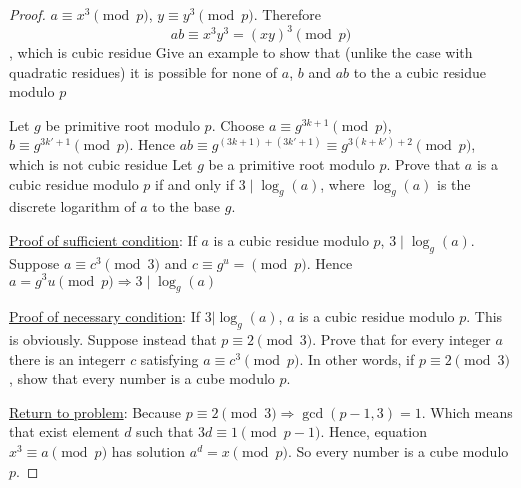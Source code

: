 \begin{proof}
	$a \equiv x^3 \pmod p$, $y \equiv y^3 \pmod p$. Therefore $$ab \equiv x^3 y^3 = (xy)^3 \pmod p$$, which is cubic residue
	Give an example to show that (unlike the case with quadratic residues) it is possible for none of $a$, $b$ and $ab$ to the a cubic residue modulo $p$

Let $g$ be primitive root modulo $p$. Choose $a \equiv g^{3k+1} \pmod p$, $b \equiv g^{3k'+1} \pmod p$. Hence $ab \equiv g^{(3k+1)+(3k'+1)} \equiv g^{3(k+k')+2} \pmod p$, which is not cubic residue
	Let $g$ be a primitive root modulo $p$. Prove that $a$ is a cubic residue modulo $p$ if and only if $3 \mid \log_g(a)$, where $\log_g(a)$ is the discrete logarithm of $a$ to the base $g$.

\underline{Proof of sufficient condition}: If $a$ is a cubic residue modulo $p$, $3 \mid \log_g(a)$. Suppose $a \equiv c^3 \pmod 3$ and $c \equiv g^u = \pmod p$. Hence $a = g^3u \pmod p \Rightarrow 3 \mid \log_g(a)$

\underline{Proof of necessary condition}: If $3 | \log_g(a)$, $a$ is a cubic residue modulo $p$. This is obviously.
	Suppose instead that $p \equiv 2 \pmod 3$. Prove that for every integer $a$ there is an integerr $c$ satisfying $a \equiv c^3 \pmod p$. In other words, if $p \equiv 2 \pmod 3$, show that every number is a cube modulo $p$.

\underline{Return to problem}: Because $p \equiv 2 \pmod 3 \Rightarrow \gcd(p-1, 3) = 1$. Which means that exist element $d$ such that $3d \equiv 1 \pmod{p-1}$. Hence, equation $x^3 \equiv a \pmod p$ has solution $a^d = x \pmod p$. So every number is a cube modulo $p$.
	
\end{proof}
